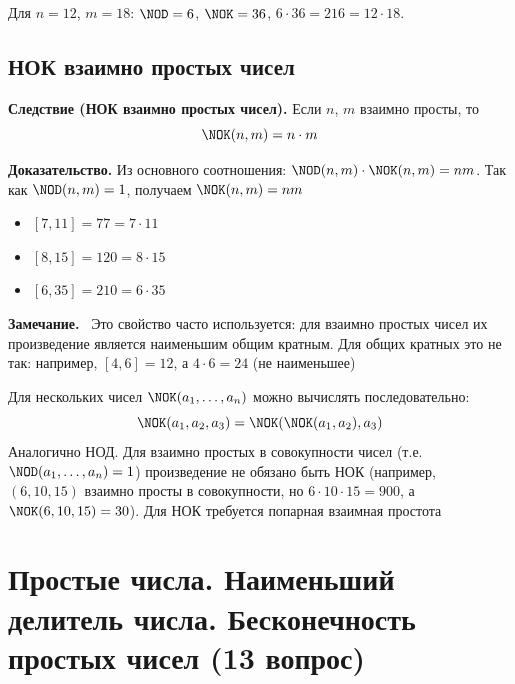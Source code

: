 \documentclass[a4paper,12pt]{article}
\newcommand{\myremark}{\textbf{Замечание.}\ }
\theoremstyle{definition}
\theoremstyle{plain}
\theoremstyle{remark}
\begin{document}
	\begin{tcolorbox}[colback=blue!5, colframe=blue!40!black, title=Пример]
	Для $n=12$, $m=18$: $\NOD=6$, $\NOK=36$, $6 \cdot 36 = 216 = 12 \cdot 18$.
	\end{tcolorbox}
	
	\subsection{НОК взаимно простых чисел}
	
	\noindent \textbf{Следствие (НОК взаимно простых чисел).}
	Если $n$, $m$ взаимно просты, то
	\[
	\NOK(n, m) = n \cdot m
	\]
	
	\medskip
	\noindent \textbf{Доказательство.}
	Из основного соотношения: $\NOD(n, m) \cdot \NOK(n, m) = n m$. Так как $\NOD(n, m) = 1$, получаем $\NOK(n, m) = n m$
	
	\begin{tcolorbox}[colback=gray!5, colframe=gray!50, title=Примеры]
	\begin{itemize}
	\item $[7, 11] = 77 = 7 \cdot 11$
	\item $[8, 15] = 120 = 8 \cdot 15$
	\item $[6, 35] = 210 = 6 \cdot 35$
	\end{itemize}
	\end{tcolorbox}
	
	\myremark
	Это свойство часто используется: для взаимно простых чисел их произведение является наименьшим общим кратным. Для общих кратных это не так: например, $[4,6] = 12$, а $4 \cdot 6 = 24$ (не наименьшее)
	
	\begin{tcolorbox}[colback=purple!5, colframe=purple!50!black, title=Заметочка: Обобщение на несколько чисел]
	Для нескольких чисел $\NOK(a_1, \dots, a_n)$ можно вычислять последовательно:
	\[
	\NOK(a_1, a_2, a_3) = \NOK(\NOK(a_1, a_2), a_3)
	\]
	Аналогично НОД. Для взаимно простых в совокупности чисел (т.е. $\NOD(a_1, \dots, a_n) = 1$) произведение не обязано быть НОК (например, $(6,10,15)$ взаимно просты в совокупности, но $6 \cdot 10 \cdot 15 = 900$, а $\NOK(6,10,15)=30$). Для НОК требуется попарная взаимная простота
	\end{tcolorbox}
	
	
	
	
	
	
	\newpage
	\section{Простые числа. Наименьший делитель числа. Бесконечность простых чисел (13 вопрос)}
	
\end{document}
